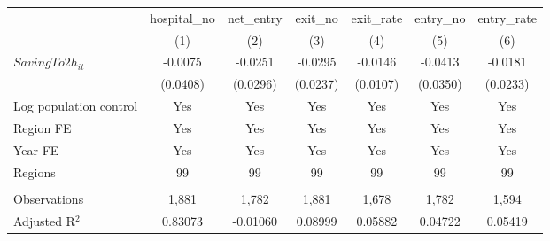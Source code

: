 \begingroup
\centering
\begin{tabular}{lcccccc}
   \toprule
                          & hospital\_no  & net\_entry  & exit\_no  & exit\_rate  & entry\_no  & entry\_rate \\    
                          & (1)           & (2)         & (3)       & (4)         & (5)        & (6)\\  
   \midrule 
   $SavingTo2h_{it}$      & -0.0075       & -0.0251     & -0.0295   & -0.0146     & -0.0413    & -0.0181\\   
                          & (0.0408)      & (0.0296)    & (0.0237)  & (0.0107)    & (0.0350)   & (0.0233)\\   
   Log population control & Yes           & Yes         & Yes       & Yes         & Yes        & Yes\\  
   Region FE              & Yes           & Yes         & Yes       & Yes         & Yes        & Yes\\  
   Year FE                & Yes           & Yes         & Yes       & Yes         & Yes        & Yes\\  
   Regions                & 99            & 99          & 99        & 99          & 99         & 99\\  
    \\
   Observations           & 1,881         & 1,782       & 1,881     & 1,678       & 1,782      & 1,594\\  
   Adjusted R$^2$         & 0.83073       & -0.01060    & 0.08999   & 0.05882     & 0.04722    & 0.05419\\  
   \bottomrule
\end{tabular}
\par\endgroup
